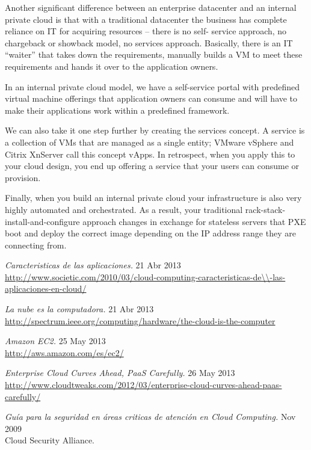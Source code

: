 \documentclass[12pt,a4paper]{article}
\begin{document}
Another significant difference between an enterprise datacenter and an internal private cloud is that with a 
traditional datacenter the business has complete reliance on IT for acquiring resources -- there is no self-
service approach, no chargeback or showback model, no services approach. Basically, there is an IT “waiter” 
that takes down the requirements, manually builds a VM to meet these requirements and hands it over to the 
application owners.

In an internal private cloud model, we have a self-service portal with predefined virtual machine offerings 
that application owners can consume and will have to make their applications work within a predefined 
framework.

We can also take it one step further by creating the services concept. A service is a collection of VMs that 
are managed as a single entity; VMware vSphere and Citrix XnServer call this concept vApps. In retrospect, when 
you apply this to your cloud design, you end up offering a service that your users can consume or provision.

Finally, when you build an internal private cloud your infrastructure is also very highly automated and 
orchestrated. As a result, your traditional rack-stack-install-and-configure approach changes in exchange for 
stateless servers that PXE boot and deploy the correct image depending on the IP address range they are 
connecting from.

\newpage

\begin{thebibliography}{1}

\emph{Caracteristicas de las aplicaciones. }
 21 Abr 2013\\
\url{http://www.societic.com/2010/03/cloud-computing-caracteristicas-de\\-las-aplicaciones-en-cloud/}
 
\emph{La nube es la computadora. } 
 21 Abr 2013\\
 \url{http://spectrum.ieee.org/computing/hardware/the-cloud-is-the-computer}

\emph{Amazon EC2. }
 25 May 2013\\
 \url{http://aws.amazon.com/es/ec2/} 

\emph{Enterprise Cloud Curves Ahead, PaaS Carefully. }
 26 May 2013\\
 \url{http://www.cloudtweaks.com/2012/03/enterprise-cloud-curves-ahead-paas-carefully/}

\emph{Guía para la seguridad en áreas criticas de atención en Cloud Computing. }
 Nov 2009\\
 Cloud Security Alliance.

\end{thebibliography}
\end{document}
